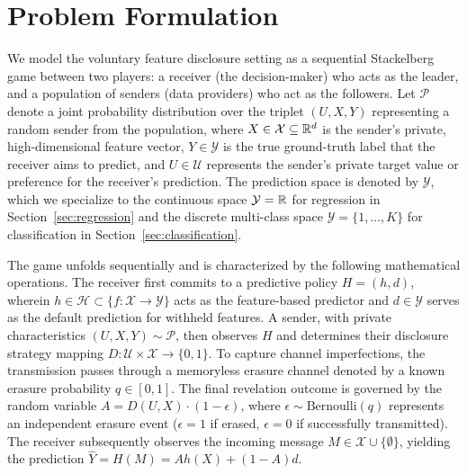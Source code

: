 \section{Problem Formulation}
\label{sec:formulation}

We model the voluntary feature disclosure setting as a sequential Stackelberg game between two players: a receiver (the decision-maker) who acts as the leader, and a population of senders (data providers) who act as the followers. Let $\mathcal{P}$ denote a joint probability distribution over the triplet $(U, X, Y)$ representing a random sender from the population, where $X \in \mathcal{X} \subseteq \mathbb{R}^d$ is the sender's private, high-dimensional feature vector, $Y \in \mathcal{Y}$ is the true ground-truth label that the receiver aims to predict, and $U \in \mathcal{U}$ represents the sender's private target value or preference for the receiver's prediction. The prediction space is denoted by $\mathcal{Y}$, which we specialize to the continuous space $\mathcal{Y} = \mathbb{R}$ for regression in Section~\ref{sec:regression} and the discrete multi-class space $\mathcal{Y} = \{1, \dots, K\}$ for classification in Section~\ref{sec:classification}.

The game unfolds sequentially and is characterized by the following mathematical operations. The receiver first commits to a predictive policy $H = (h, d)$, wherein $h \in \mathcal{H} \subset \{f: \mathcal{X} \to \mathcal{Y}\}$ acts as the feature-based predictor and $d \in \mathcal{Y}$ serves as the default prediction for withheld features. A sender, with private characteristics $(U, X, Y) \sim \mathcal{P}$, then observes $H$ and determines their disclosure strategy mapping $D: \mathcal{U} \times \mathcal{X} \to \{0, 1\}$. To capture channel imperfections, the transmission passes through a memoryless erasure channel denoted by a known erasure probability $q \in [0, 1]$. The final revelation outcome is governed by the random variable $A = D(U, X) \cdot (1 - \epsilon)$, where $\epsilon \sim \text{Bernoulli}(q)$ represents an independent erasure event ($\epsilon = 1$ if erased, $\epsilon = 0$ if successfully transmitted). The receiver subsequently observes the incoming message $M \in \mathcal{X} \cup \{\emptyset\}$, yielding the prediction $\hat{Y} = H(M) = A h(X) + (1-A)d$. 

